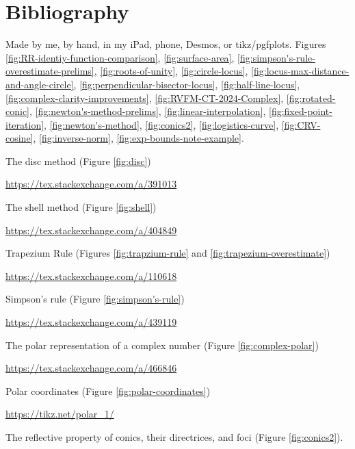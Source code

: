 \chapter{Bibliography}
\begin{enumerate}[label={[\arabic*]}]
  \item\label{Me} Made by me, by hand, in my iPad, phone, Desmos, or tikz/pgfplots. Figures 
  \ref{fig:RR-identiy-function-comparison}, 
  \ref{fig:surface-area}, 
  \ref{fig:simpson's-rule-overestimate-prelims}, 
  \ref{fig:roots-of-unity}, 
  \ref{fig:circle-locus}, 
  \ref{fig:locus-max-distance-and-angle-circle}, 
  \ref{fig:perpendicular-bisector-locus}, 
  \ref{fig:half-line-locus}, 
  \ref{fig:complex-clarity-improvements}, 
  \ref{fig:RVFM-CT-2024-Complex}, 
  \ref{fig:rotated-conic}, 
  \ref{fig:newton's-method-prelims}, 
  \ref{fig:linear-interpolation}, 
  \ref{fig:fixed-point-iteration}, 
  \ref{fig:newton's-method}, 
  \ref{fig:conics2},
  \ref{fig:logistics-curve},
  \ref{fig:CRV-cosine},
  \ref{fig:inverse-norm},
  \ref{fig:exp-bounds-note-example}.
  \item\label{source:disc} The disc method (Figure \ref{fig:disc}) 
  
  \url{https://tex.stackexchange.com/a/391013}
  \item\label{source:shell} The shell method (Figure \ref{fig:shell}) 
  
  \url{https://tex.stackexchange.com/a/404849}
  \item\label{source:trapzium-rule} Trapezium Rule (Figures \ref{fig:trapzium-rule} and \ref{fig:trapezium-overestimate}) 

  \url{https://tex.stackexchange.com/a/110618}
  \item\label{source:simpson's-rule} Simpson's rule (Figure \ref{fig:simpson's-rule}) 
  
  \url{https://tex.stackexchange.com/a/439119}
  \item\label{source:complex-polar} The polar representation of a complex number (Figure \ref{fig:complex-polar}) 
  
  \url{https://tex.stackexchange.com/a/466846}
  \item\label{source:polar-coordinates} Polar coordinates (Figure \ref{fig:polar-coordinates})
  
  \url{https://tikz.net/polar_1/}
  \item\label{source:conics2} The reflective property of conics, their directrices, and foci (Figure \ref{fig:conics2}). 
  

\end{enumerate}
